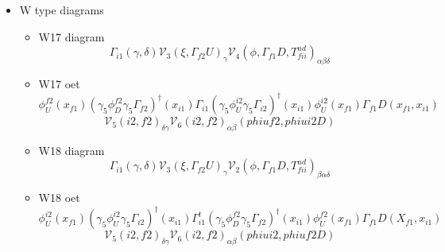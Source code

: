 \documentclass{article}[12pt]
\begin{document}
\begin{itemize}
\begin{itemize}
\item B11 diagram
$$
\Gamma_{i1}\left(\gamma,\delta\right){\mathcal V}_3\left(\xi,\Gamma_{f2}T^{ud}\right)_\beta{\mathcal V}_2\left(\phi,\Gamma_{f1}D,U\right)_{\delta\alpha\gamma}
$$
\item B11 oet
$$
U(x_{f1},x_{i1})\Gamma_{i1}D^t(x_{f1},x_{i1})\Gamma_{f1}^t\phi_U^{f2}(x_{f1})(\gamma_5\phi_D^{f2}\gamma_5\Gamma_{f2})^{\dagger}(x_{i2})\Gamma_{i2}D(x_{i2},x_{i1})
$$
$$
\Gamma_{i1}\left(\gamma,\delta\right){\mathcal V}_3\left(\gamma_5\phi_D^{f2}\gamma_5\Gamma_{f2},\Gamma_{i2}D\right)_{\beta}
{\mathcal V}_2\left(\phi_U^{f2},\Gamma_{f1}D,U\right)_{\delta\alpha\gamma}
$$
\item B12 diagram
$$
\Gamma_{i1}\left(\gamma,\delta\right){\mathcal V}_3\left(\xi,\Gamma_{f2}T^{ud}\right)_\beta{\mathcal V}_4\left(\phi,\Gamma_{f1}D,U\right)_{\alpha\delta\gamma}
$$
\item B12 oet
$$
\phi_U^{f2}(x_{f1})(\gamma_5\phi_D^{f2}\gamma_5\Gamma_{f2})^{\dagger}(x_{i2})\Gamma_{i2}D(x_{i2},x_{i1})\mathrm{Tr}
U(x_{f1},x_{i1})\Gamma_{i1}D^t(x_{f1},x_{i1})\Gamma_{f1}^t
$$
$$
\Gamma_{i1}\left(\gamma,\delta\right){\mathcal V}_3\left(\gamma_5\phi_D^{f2}\gamma_5\Gamma_{f2},\Gamma_{i2}D\right)_{\beta}
{\mathcal V}_4\left(\phi_U^{f2},\Gamma_{f1}^tU,D\right)_{\alpha\gamma\delta}
$$
\end{itemize}
\item W type diagrams
\begin{itemize}
\item W17 diagram
$$
\Gamma_{i1}\left(\gamma,\delta\right){\mathcal V}_3\left(\xi,\Gamma_{f2}U\right)_\gamma{\mathcal V}_4\left(\phi,\Gamma_{f1}D,T^{ud}_{fii}\right)_{\alpha\beta\delta}
$$
\item W17 oet
$$
\phi_U^{f2}(x_{f1})(\gamma_5\phi_D^{f2}\gamma_5\Gamma_{f2})^{\dagger}(x_{i1})
\Gamma_{i1}(\gamma_5\phi_U^{i2}\gamma_5\Gamma_{i2})^{\dagger}(x_{i1})\phi_U^{i2}(x_{f1})\Gamma_{f1}D(x_{f1},x_{i1})
$$
$$
{\mathcal V}_5(i2,f2)_{\delta\gamma}{\mathcal V}_6(i2,f2)_{\alpha\beta}(phiuf2,phiui2D)
$$
\item W18 diagram
$$
\Gamma_{i1}\left(\gamma,\delta\right){\mathcal V}_3\left(\xi,\Gamma_{f2}U\right)_\gamma{\mathcal V}_2\left(\phi,\Gamma_{f1}D,T^{ud}_{fii}\right)_{\beta\alpha\delta}
$$
\item W18 oet
$$
\phi_U^{i2}(x_{f1})(\gamma_5\phi_U^{i2}\gamma_5\Gamma_{i2})^{\dagger}(x_{i1})
\Gamma_{i1}^t(\gamma_5\phi_D^{f2}\gamma_5\Gamma_{f2})^{\dagger}(x_{i1})\phi_U^{f2}(x_{f1})\Gamma_{f1}D(X_{f1},x_{i1})
$$
$$
{\mathcal V}_5(i2,f2)_{\delta\gamma}{\mathcal V}_6(i2,f2)_{\alpha\beta}(phiui2,phiuf2D)
$$
\end{itemize}
\end{itemize}
\end{document}
